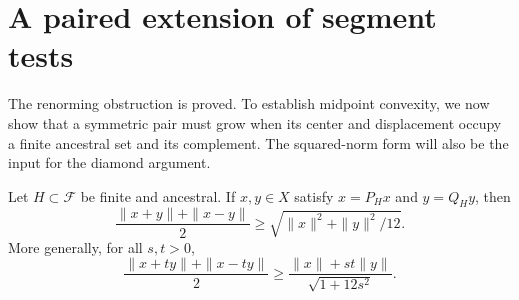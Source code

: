 \section{A paired extension of segment tests}\label{sec:paired}

The renorming obstruction is proved. To establish midpoint convexity,
we now show that a symmetric pair must grow when its center and
displacement occupy a finite ancestral set and its complement. The
squared-norm form will also be the input for the diamond argument.

\begin{lemma}\label{lem:paired}
Let $H\subset\mathcal F$ be finite and ancestral. If $x,y\in X$
satisfy $x=P_Hx$ and $y=Q_Hy$, then
\begin{equation}\label{eq:paired}
 \frac{\|x+y\|+\|x-y\|}{2}
 \ge\sqrt{\|x\|^2+\|y\|^2/12}.
\end{equation}
More generally, for all $s,t>0$,
\begin{equation}\label{eq:paired-two-parameters}
 \frac{\|x+ty\|+\|x-ty\|}{2}
 \ge\frac{\|x\|+st\|y\|}{\sqrt{1+12s^2}}.
\end{equation}
\end{lemma}

